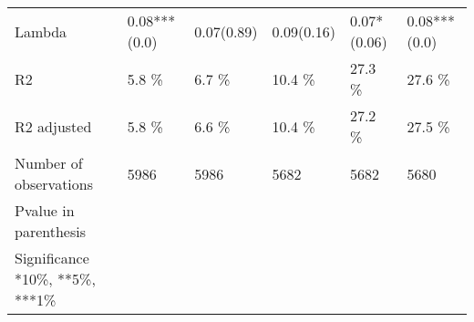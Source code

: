 \begin{tabular}{llllll}
Lambda                          &    0.08***(0.0) &     0.07(0.89) &     0.09(0.16) &    0.07*(0.06) &   0.08***(0.0) \\
R2                              &           5.8 \% &          6.7 \% &         10.4 \% &         27.3 \% &         27.6 \% \\
R2 adjusted                     &           5.8 \% &          6.6 \% &         10.4 \% &         27.2 \% &         27.5 \% \\
Number of observations          &            5986 &           5986 &           5682 &           5682 &           5680 \\
Pvalue in parenthesis           &                 &                &                &                &                \\
Significance *10\%, **5\%, ***1\%  &                 &                &                &                &                \\
\bottomrule
\end{tabular}
